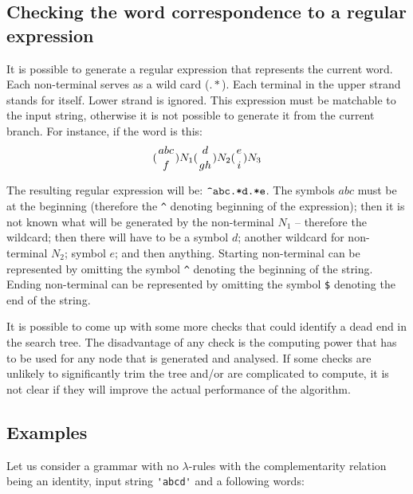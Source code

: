 \subsection{Checking the word correspondence to a regular expression}
It is possible to generate a regular expression that represents the current word. Each non-terminal serves as a wild card ($.*$). Each terminal in the upper strand stands for itself. Lower strand is ignored. This expression must be matchable to the input string, otherwise it is not possible to generate it from the current branch. For instance, if the word is this:
$$({abc \atop f})N_1({d \atop gh})N_2({e \atop i})N_3$$

The resulting regular expression will be: $\verb/^abc.*d.*e/$. The symbols $abc$ must be at the beginning (therefore the \verb/^/ denoting beginning of the expression); then it is not known what will be generated by the non-terminal $N_1$ -- therefore the wildcard; then there will have to be a symbol $d$; another wildcard for non-terminal $N_2$; symbol $e$; and then anything. Starting non-terminal can be represented by omitting the symbol \verb/^/ denoting the beginning of the string. Ending non-terminal can be represented by omitting the symbol \verb/$/ denoting the end of the string.

It is possible to come up with some more checks that could identify a dead end in the search tree. The disadvantage of any check is the computing power that has to be used for any node that is generated and analysed. If some checks are unlikely to significantly trim the tree and/or are complicated to compute, it is not clear if they will improve the actual performance of the algorithm.

\subsection{Examples}
Let us consider a grammar with no $\lambda$-rules with the complementarity relation being an identity, input string \verb/'abcd'/  and a following words:

